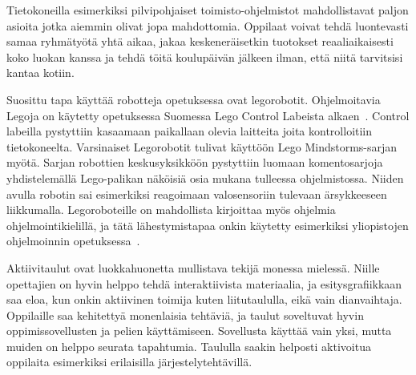 \documentclass[utf8,bachelor]{gradu3}
\begin{document}
Tietokoneilla esimerkiksi pilvipohjaiset toimisto-ohjelmistot mahdollistavat paljon asioita jotka aiemmin olivat jopa mahdottomia. Oppilaat voivat tehdä luontevasti samaa ryhmätyötä yhtä aikaa, jakaa keskeneräisetkin tuotokset reaaliaikaisesti koko luokan kanssa ja tehdä töitä  koulupäivän jälkeen ilman, että niitä tarvitsisi kantaa kotiin.

Suosittu tapa käyttää robotteja opetuksessa ovat legorobotit. Ohjelmoitavia Legoja on käytetty opetuksessa Suomessa  Lego Control Labeista alkaen~\parencite[][s. 22-23]{skrolliRobot}. Control labeilla pystyttiin kasaamaan paikallaan olevia laitteita joita kontrolloitiin tietokoneelta. Varsinaiset Legorobotit tulivat käyttöön Lego Mindstorms-sarjan myötä. Sarjan robottien keskusyksikköön pystyttiin luomaan komentosarjoja yhdistelemällä Lego-palikan näköisiä osia mukana tulleessa ohjelmistossa. Niiden avulla robotin sai esimerkiksi reagoimaan valosensoriin tulevaan ärsykkeeseen liikkumalla. Legoroboteille on mahdollista kirjoittaa myös ohjelmia ohjelmointikielillä, ja tätä lähestymistapaa onkin käytetty esimerkiksi yliopistojen ohjelmoinnin opetuksessa~\parencite[][]{korppirobo, hesarobo}.

Aktiivitaulut ovat luokkahuonetta mullistava tekijä monessa mielessä. Niille opettajien on hyvin helppo tehdä interaktiivista materiaalia, ja esitysgrafiikkaan saa eloa, kun onkin aktiivinen toimija kuten liitutaululla, eikä vain dianvaihtaja. Oppilaille saa kehitettyä monenlaisia tehtäviä, ja taulut soveltuvat hyvin oppimissovellusten ja pelien käyttämiseen. Sovellusta käyttää vain yksi, mutta muiden on helppo seurata tapahtumia. Taululla saakin helposti aktivoitua oppilaita esimerkiksi erilaisilla järjestelytehtävillä.
\end{document}
